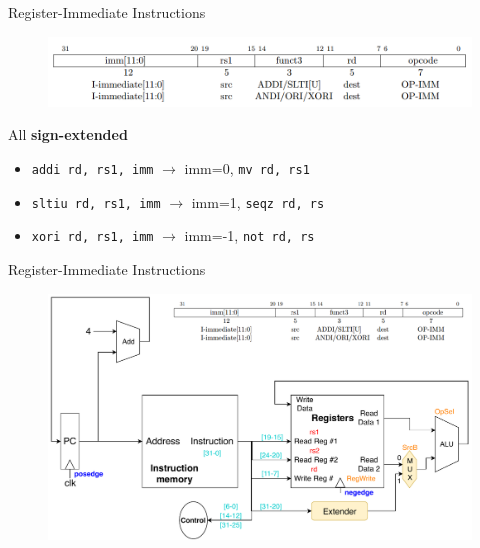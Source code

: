 \documentclass{myslide}
\begin{document}
\begin{frame}[fragile]{Register-Immediate Instructions}
\begin{figure}
\centering
\includegraphics[width=\linewidth]{fig/Lecture2/r-i.PNG}
\end{figure}
All \textbf{sign-extended}
\begin{itemize}
	\item \verb'addi rd, rs1, imm' $\to$ imm=0, \verb'mv rd, rs1'
	\item \verb'sltiu rd, rs1, imm' $\to$ imm=1, \verb'seqz rd, rs'
	\item \verb'xori rd, rs1, imm' $\to$ imm=-1, \verb'not rd, rs'
\end{itemize}
\end{frame}

\begin{frame}[fragile]{Register-Immediate Instructions}
\begin{figure}
\centering
\includegraphics[width=\linewidth]{fig/Lecture2/Datapath-R-I.pdf}
\end{figure}
\end{frame}
\end{document}
